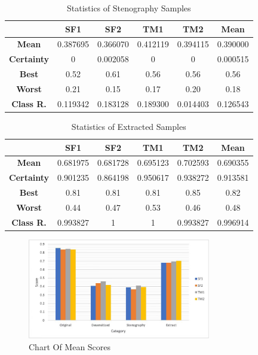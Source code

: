 \documentclass[journal]{IEEEtran} %
\begin{document}
\begin{CJK*}{UTF8}{gbsn}
\begin{table}[htbp]
    \centering
    \caption{Statistics of Stenography Samples}
    \begin{tabular}{|c|c|c|c|c|c|}
        \hline
        & \textbf{SF1} & \textbf{SF2} & \textbf{TM1} & \textbf{TM2} & \textbf{Mean} \\
        \hline
        \textbf{Mean} & 0.387695 & 0.366070 & 0.412119 & 0.394115 & 0.390000 \\
        \hline
        \textbf{Certainty} & 0 & 0.002058 & 0 & 0 & 0.000515 \\
        \hline
        \textbf{Best} & 0.52 & 0.61 & 0.56 & 0.56 & 0.56 \\
        \hline
        \textbf{Worst} & 0.21 & 0.15 & 0.17 & 0.20 & 0.18 \\
        \hline
        \textbf{Class R.} & 0.119342 & 0.183128 & 0.189300 & 0.014403 & 0.126543 \\
        \hline
    \end{tabular}
    \label{tab:st_msg}
\end{table}

\begin{table}[htbp]
    \centering
    \caption{Statistics of Extracted Samples}
    \begin{tabular}{|c|c|c|c|c|c|}
        \hline
        & \textbf{SF1} & \textbf{SF2} & \textbf{TM1} & \textbf{TM2} & \textbf{Mean} \\
        \hline
        \textbf{Mean} & 0.681975 & 0.681728 & 0.695123 & 0.702593 & 0.690355 \\
        \hline
        \textbf{Certainty} & 0.901235 & 0.864198 & 0.950617 & 0.938272 & 0.913581 \\
        \hline
        \textbf{Best} & 0.81 & 0.81 & 0.81 & 0.85 & 0.82 \\
        \hline
        \textbf{Worst} & 0.44 & 0.47 & 0.53 & 0.46 & 0.48 \\
        \hline
        \textbf{Class R.} & 0.993827 & 1 & 1 & 0.993827 & 0.996914 \\
        \hline
    \end{tabular}
    \label{tab:st_rec}
\end{table}

\begin{figure}[htbp]
    \centerline{\includegraphics[width=8cm]{chart.jpg}}
    \caption{Chart Of Mean Scores}
    \label{chart_mean}
\end{figure}


\end{CJK*}
\end{document}
